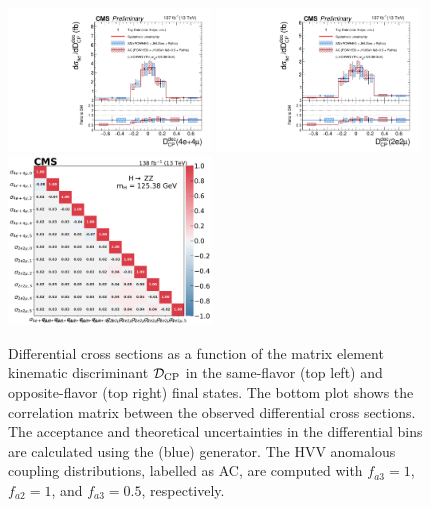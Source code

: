 \clearpage

\begin{center}
	\begin{figure}[!htb]
		\centering
		\includegraphics[width=0.48\textwidth]{Images/H4L/discriminants/model_v4/Dcp_unfoldwith_4l_SM_125_asimov.pdf}
		\includegraphics[width=0.48\textwidth]{Images/H4L/discriminants/model_v4/Dcp_unfoldwith_2e2mu_SM_125_asimov.pdf}\\
		\includegraphics[width=0.48\textwidth]{Images/H4L/correlations/corr_Dcp_v4.pdf}\\
		\caption{
			Differential cross sections as a function of the matrix element kinematic discriminant ${\mathcal D}_{\text{CP}}$ in the same-flavor (top left) and opposite-flavor (top right)  final states.
			The bottom plot shows the correlation matrix between the observed differential cross sections.
			The acceptance and theoretical uncertainties in the differential bins are calculated using the \POWHEG (blue) generator.
			The HVV anomalous coupling distributions, labelled as AC, are computed with $f_{a3} = 1$, $f_{a2} = 1$, and $f_{a3} = 0.5$, respectively.
			\label{fig:fidDCP}}
	\end{figure}
\end{center}

